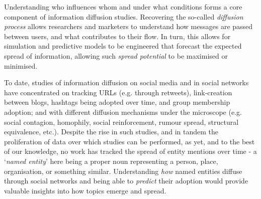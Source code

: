 \documentclass[10pt,journal,compsoc]{IEEEtran}
\begin{document}
\maketitle


\IEEEdisplaynontitleabstractindextext



%
\IEEEpeerreviewmaketitle

Understanding who influences whom and under what conditions forms a core component of information diffusion studies.
Recovering the so-called \emph{diffusion process} allows researchers and marketers to understand how messages are passed between users, and what contributes to their flow.
In turn, this allows for simulation and predictive models to be engineered that forecast the expected spread of information, allowing such \emph{spread potential} to be maximised or minimised.

To date, studies of information diffusion on social media and in social networks have concentrated on tracking URLs (e.g. through retweets), link-creation between blogs, hashtags being adopted over time, and group membership adoption; and with different diffusion mechanisms under the microscope (e.g. social contagion, homophily, social reinforcement, rumour spread, structural equivalence, etc.).
Despite the rise in such studies, and in tandem the proliferation of data over which studies can be performed, as yet, and to the best of our knowledge, no work has tracked the spread of entity mentions over time - a `\emph{named entity}' here being a proper noun representing a person, place, organisation, or something similar.
Understanding \emph{how} named entities diffuse through social networks and being able to \emph{predict} their adoption would provide valuable insights into how topics emerge and spread.
\end{document}
